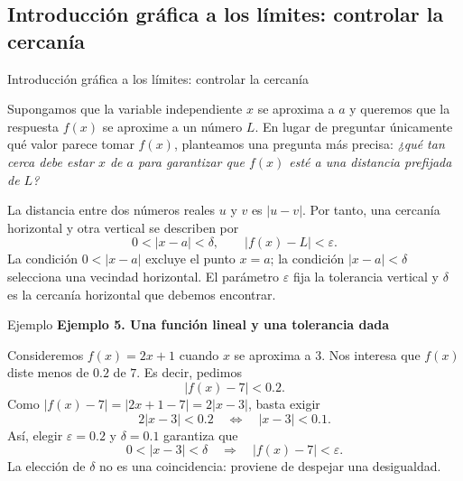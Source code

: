 \documentclass[12pt,aspectratio=169]{beamer}
\begin{document}
\subsection{Introducción gráfica a los límites: controlar la cercanía}

\begin{frame}[t,allowframebreaks]{Introducción gráfica a los límites: controlar la cercanía}

Supongamos que la variable independiente $x$ se aproxima a $a$ y queremos que la respuesta $f(x)$ se aproxime a un número $L$. En lugar de preguntar únicamente qué valor parece tomar $f(x)$, planteamos una pregunta más precisa: \emph{¿qué tan cerca debe estar $x$ de $a$ para garantizar que $f(x)$ esté a una distancia prefijada de $L$?}

La distancia entre dos números reales $u$ y $v$ es $|u-v|$. Por tanto, una cercanía horizontal y otra vertical se describen por
\[
 0<|x-a|<\delta,\qquad |f(x)-L|<\varepsilon.
\]
La condición $0<|x-a|$ excluye el punto $x=a$; la condición $|x-a|<\delta$ selecciona una vecindad horizontal. El parámetro $\varepsilon$ fija la tolerancia vertical y $\delta$ es la cercanía horizontal que debemos encontrar.
\end{frame}


\begin{frame}[t,allowframebreaks]{Ejemplo}
{\color{azul}\bfseries Ejemplo 5. Una función lineal y una tolerancia dada}\par\medskip

Consideremos $f(x)=2x+1$ cuando $x$ se aproxima a $3$. Nos interesa que $f(x)$ diste menos de $0.2$ de $7$. Es decir, pedimos
\[
 |f(x)-7|<0.2.
\]
Como $|f(x)-7|=|2x+1-7|=2|x-3|$, basta exigir
\[
 2|x-3|<0.2\quad\Longleftrightarrow\quad |x-3|<0.1.
\]
Así, elegir $\varepsilon=0.2$ y $\delta=0.1$ garantiza que
\[
 0<|x-3|<\delta\quad\Longrightarrow\quad |f(x)-7|<\varepsilon.
\]
La elección de $\delta$ no es una coincidencia: proviene de despejar una desigualdad.
\end{frame}
\end{document}
